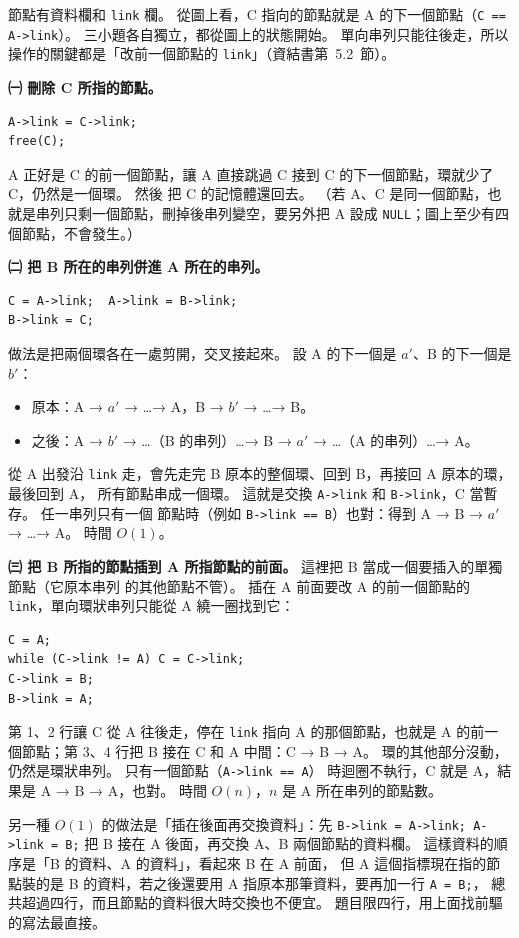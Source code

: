 \begin{pastsoln}
節點有資料欄和 \texttt{link} 欄。 從圖上看，C 指向的節點就是 A 的下一個節點（\texttt{C == A->link}）。
三小題各自獨立，都從圖上的狀態開始。 單向串列只能往後走，所以操作的關鍵都是「改前一個節點的
\texttt{link}」（資結書第~5.2~節）。

\textbf{㈠ 刪除 C 所指的節點。}
\begin{verbatim}
A->link = C->link;
free(C);
\end{verbatim}
A 正好是 C 的前一個節點，讓 A 直接跳過 C 接到 C 的下一個節點，環就少了 C，仍然是一個環。 然後
把 C 的記憶體還回去。 （若 A、C 是同一個節點，也就是串列只剩一個節點，刪掉後串列變空，要另外把
A 設成 \texttt{NULL}；圖上至少有四個節點，不會發生。）

\textbf{㈡ 把 B 所在的串列併進 A 所在的串列。}
\begin{verbatim}
C = A->link;  A->link = B->link;
B->link = C;
\end{verbatim}
做法是把兩個環各在一處剪開，交叉接起來。 設 A 的下一個是 $a'$、B 的下一個是 $b'$：
\begin{itemize}
\item 原本：A → $a'$ → \dots → A，B → $b'$ → \dots → B。
\item 之後：A → $b'$ → \dots（B 的串列）\dots → B → $a'$ → \dots（A 的串列）\dots → A。
\end{itemize}
從 A 出發沿 \texttt{link} 走，會先走完 B 原本的整個環、回到 B，再接回 A 原本的環，最後回到 A，
所有節點串成一個環。 這就是交換 \texttt{A->link} 和 \texttt{B->link}，C 當暫存。 任一串列只有一個
節點時（例如 \texttt{B->link == B}）也對：得到 A → B → $a'$ → \dots → A。 時間 $O(1)$。

\textbf{㈢ 把 B 所指的節點插到 A 所指節點的前面。} 這裡把 B 當成一個要插入的單獨節點（它原本串列
的其他節點不管）。 插在 A 前面要改 A 的前一個節點的 \texttt{link}，單向環狀串列只能從 A 繞一圈找到它：
\begin{verbatim}
C = A;
while (C->link != A) C = C->link;
C->link = B;
B->link = A;
\end{verbatim}
第 1、2 行讓 C 從 A 往後走，停在 \texttt{link} 指向 A 的那個節點，也就是 A 的前一個節點；第 3、4 行把
B 接在 C 和 A 中間：C → B → A。 環的其他部分沒動，仍然是環狀串列。 只有一個節點（\texttt{A->link == A}）
時迴圈不執行，C 就是 A，結果是 A → B → A，也對。 時間 $O(n)$，$n$ 是 A 所在串列的節點數。

另一種 $O(1)$ 的做法是「插在後面再交換資料」：先 \texttt{B->link = A->link; A->link = B;} 把 B 接在 A
後面，再交換 A、B 兩個節點的資料欄。 這樣資料的順序是「B 的資料、A 的資料」，看起來 B 在 A 前面，
但 A 這個指標現在指的節點裝的是 B 的資料，若之後還要用 A 指原本那筆資料，要再加一行 \texttt{A = B;}，
總共超過四行，而且節點的資料很大時交換也不便宜。 題目限四行，用上面找前驅的寫法最直接。
\end{pastsoln}
